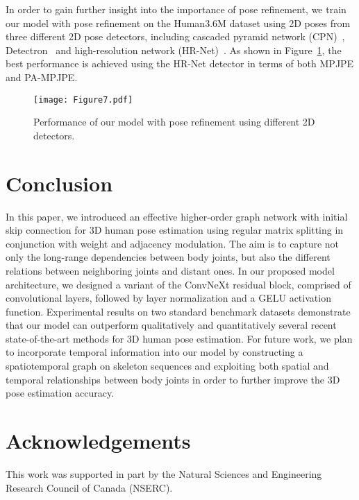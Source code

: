 \documentclass[10pt,journal]{IEEEtran}
\begin{document}
In order to gain further insight into the importance of pose refinement, we train our model with pose refinement on the Human3.6M dataset using 2D poses from three different 2D pose detectors, including cascaded pyramid network (CPN)~\cite{chen2018cascaded}, Detectron~\cite{wu2019detectron2} and high-resolution network (HR-Net)~\cite{sun2019deep}. As shown in Figure~\ref{Fig:detectors}, the best performance is achieved using the HR-Net detector in terms of both MPJPE and PA-MPJPE.
\begin{figure}[!htb]
\centering
\texttt{[image: Figure7.pdf]}
\caption{Performance of our model with pose refinement using different 2D detectors.}
\label{Fig:detectors}
\end{figure}
	
\section{Conclusion}
In this paper, we introduced an effective higher-order graph network with initial skip connection for 3D human pose estimation using regular matrix splitting in conjunction with weight and adjacency modulation. The aim is to capture not only the long-range dependencies between body joints, but also the different relations between neighboring joints and distant ones. In our proposed model architecture, we designed a variant of the ConvNeXt residual block, comprised of convolutional layers, followed by layer normalization and a GELU activation function. Experimental results on two standard benchmark datasets demonstrate that our model can outperform qualitatively and quantitatively several recent state-of-the-art methods for 3D human pose estimation. For future work, we plan to incorporate temporal information into our model by constructing a spatiotemporal graph on skeleton sequences and exploiting both spatial and temporal relationships between body joints in order to further improve the 3D pose estimation accuracy.

\section*{Acknowledgements}
This work was supported in part by the Natural Sciences and Engineering Research Council of Canada (NSERC).



 
\end{document}

